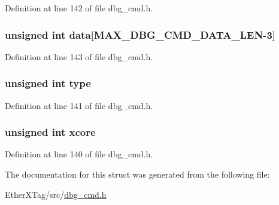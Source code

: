 Definition at line 142 of file dbg\-\_\-cmd.\-h.

\hypertarget{structdbg__cmd__type__read__obj_a728dc245dc576de10147524d6a701ef3}{
\subsubsection[{data}]{\setlength{\rightskip}{0pt plus 5cm}unsigned int data\mbox{[}{\bf M\-A\-X\-\_\-\-D\-B\-G\-\_\-\-C\-M\-D\-\_\-\-D\-A\-T\-A\-\_\-\-L\-E\-N}-\/3\mbox{]}}}\label{structdbg__cmd__type__read__obj_a728dc245dc576de10147524d6a701ef3}


Definition at line 143 of file dbg\-\_\-cmd.\-h.

\hypertarget{structdbg__cmd__type__read__obj_a4bfea42429249a1f65204f0c0f34704a}{
\subsubsection[{type}]{\setlength{\rightskip}{0pt plus 5cm}unsigned int type}}\label{structdbg__cmd__type__read__obj_a4bfea42429249a1f65204f0c0f34704a}


Definition at line 141 of file dbg\-\_\-cmd.\-h.

\hypertarget{structdbg__cmd__type__read__obj_a78357326dd562d441c3c73f5676ac638}{
\subsubsection[{xcore}]{\setlength{\rightskip}{0pt plus 5cm}unsigned int xcore}}\label{structdbg__cmd__type__read__obj_a78357326dd562d441c3c73f5676ac638}


Definition at line 140 of file dbg\-\_\-cmd.\-h.



The documentation for this struct was generated from the following file\-:\begin{DoxyCompactItemize}
\item 
Ether\-X\-Tag/src/\hyperlink{dbg__cmd_8h}{dbg\-\_\-cmd.\-h}\end{DoxyCompactItemize}
